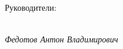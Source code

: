 \newpage

\large Руководители:

	\begin{minipage}[h]{0.47\linewidth}
		\\
		\emph{Федотов Антон Владимирович} 
	\end{minipage}
	\hfill
